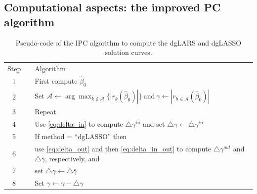 \subsection[Computational aspects: the improved PC algorithm]{Computational aspects: the improved PC algorithm}
\label{subsec:estdglars}





\begin{table}[t!]
	\caption{Pseudo-code of the IPC algorithm to compute the dgLARS and dgLASSO solution curves.} 
	\centering
	\renewcommand\arraystretch{1.4}
	\begin{tabular}{ccp{12cm}}
		\hline
		Step && Algorithm  \\
		\cline{1-1}  \cline{3-3}
		
		1 &&  First compute  $\hat{{\beta}}_{0}$ \\ %
		
		2 && Set $\mathcal{A} \leftarrow \arg\max_{k \notin \mathcal{A}} \{ |r_{k}(\hat{{\beta}}_{{0}})| \} \ \text{and} \ \gamma \leftarrow |r_{h \in \mathcal{A}}(\hat{{\beta}}_{{0}})| $  \\
		
		3 && Repeat   \\
		
		4 && \hspace{0.1in}  Use \eqref{eq:delta_in} to compute $\triangle \gamma^{in}$ and set $\triangle \gamma \leftarrow \triangle \gamma^{in}$ \\
		
		5 && \hspace{0.1in}  If method = ``dgLASSO'' then \\
		
		6 && \hspace{0.3in} use \eqref{eq:delta_out} and then \eqref{eq:delta_in_out} to compute $\triangle \gamma^{out}$ and $\triangle \bar\gamma$, respectively, and  \\
		
		7 && \hspace{0.3in} set $\triangle \gamma \leftarrow \triangle \bar\gamma$ \\
		
		8 && \hspace{0.1in}  Set $\gamma \leftarrow \gamma-\triangle \gamma$ \\
		

\end{tabular}
\end{table}
